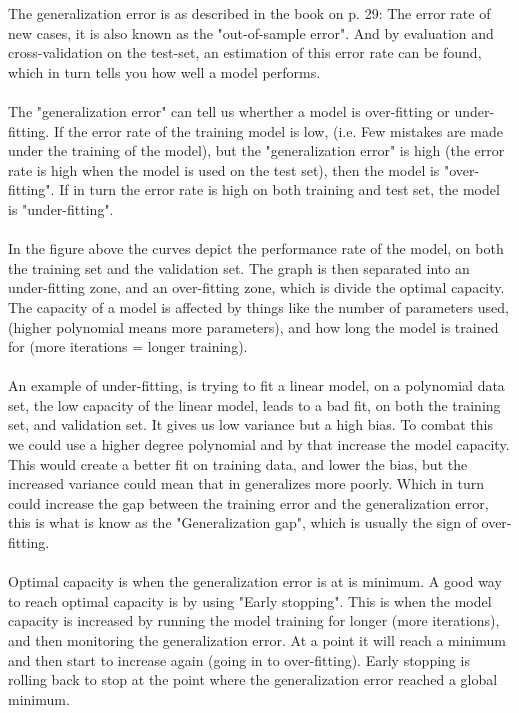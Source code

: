 \documentclass{article}
\begin{document}
The generalization error is as described in the book on p. 29: The error rate of new cases, 
it is also known as the "out-of-sample error". And by evaluation and cross-validation on the test-set,
an estimation of this error rate can be found, which in turn tells you how well a model performs.
\\ \\
The "generalization error" can tell us wherther a model is over-fitting or under-fitting.
If the error rate of the training model is low, (i.e. Few mistakes are made under the training of the model),
but the "generalization error" is high (the error rate is high when the model is used on the test set),
then the model is "over-fitting". If in turn the error rate is high on both training and test set,
the model is "under-fitting".
\\ \\
In the figure above the curves depict the performance rate of the model, on both the training set and the validation set.
The graph is then separated into an under-fitting zone, and an over-fitting zone, which is divide the optimal capacity.
The capacity of a model is affected by things like the number of parameters used, (higher polynomial  means more parameters),
and how long the model is trained for (more iterations = longer training).
\\ \\
An example of under-fitting, is trying to fit a linear model, on a polynomial data set, the low capacity of the linear model,
leads to a bad fit, on both the training set, and validation set. It gives us low variance but a high bias. To combat this we could use a higher degree polynomial and by that increase the model capacity. This would create a better fit on training data, and lower the bias,
but the increased variance could mean that in generalizes more poorly. Which in turn could increase the gap between the training error and the generalization error, this is what is know as the "Generalization gap", which is usually the sign of over-fitting.
\\ \\
Optimal capacity is when the generalization error is at is minimum. A good way to reach optimal capacity is by using  "Early stopping".
This is when the model capacity is increased by running the model training for longer (more iterations), and then monitoring the generalization error. At a point it will reach a minimum and then start to increase again (going in to over-fitting). Early stopping is rolling back to stop at the point where the generalization error reached a global minimum.
\end{document}
